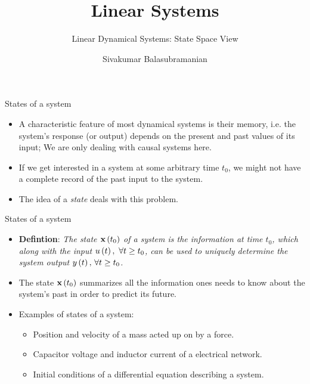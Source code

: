 \documentclass[aspectratio=169]{beamer}
\title{Linear Systems}
\subtitle{Linear Dynamical Systems: State Space View}
\author{Sivakumar Balasubramanian}
\institute[Christian Medical College] %
{
  \inst{}%
  Department of Bioengineering\\
  Christian Medical College, Bagayam\\
  Vellore 632002
}
\date{}
\def\mf{\ensuremath\mathbf}
\def\lp{\ensuremath\left(}
\def\rp{\ensuremath\right)}
\begin{document}

\begin{frame}
  \titlepage
\end{frame}


\begin{frame}[t]{States of a system}
\begin{itemize}
    \item A characteristic feature of most dynamical systems is their memory, i.e. the system's response (or output) depends on the present and past values of its input; We are only dealing with causal systems here.

    \item If we get interested in a system at some arbitrary time $t_0$, we might not have a complete record of the past input to the system.

    \item The idea of a \textit{state} deals with this problem. 
\end{itemize}
\end{frame}



\begin{frame}[t]{States of a system}
\begin{itemize}
    \item \textbf{Defintion}: \textit{The state $\mf{x}\lp t_0\rp$ of a system is the information at time $t_0$, which along with the input $u\lp t\rp,\ \forall t \geq t_0$, can be used to uniquely determine the system output $y\lp t\rp, \, \forall t \geq t_0$.}

    \item The state $\mf{x}\lp t_0\rp$ summarizes all the information ones needs to know about the system's past in order to predict its future.

    \item Examples of states of a system:
    \begin{itemize}
        \item Position and velocity of a mass acted up on by a force.
        \item Capacitor voltage and inductor current of a electrical network.
        \item Initial conditions of a differential equation describing a system.
    \end{itemize}
\end{itemize}
\end{frame}
\end{document}
